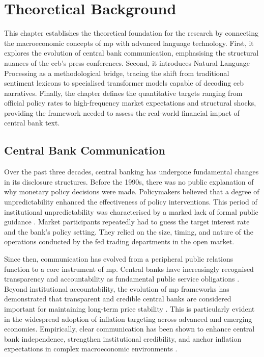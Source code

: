 \chapter{Theoretical Background}\label{ch:theory}
This chapter establishes the theoretical foundation for the research by connecting the macroeconomic concepts of \gls{mp} with advanced language technology. First, it explores the evolution of central bank communication, emphasising the structural nuances of the \gls{ecb}'s press conferences. Second, it introduces Natural Language Processing as a methodological bridge, tracing the shift from traditional sentiment lexicons to specialised transformer models capable of decoding \gls{ecb} narratives. Finally, the chapter defines the quantitative targets ranging from official policy rates to high-frequency market expectations and structural shocks, providing the framework needed to assess the real-world financial impact of central bank text.

\section{Central Bank Communication}
Over the past three decades, central banking has undergone fundamental changes in its disclosure structures. Before the 1990s, there was no public explanation of why monetary policy decisions were made. Policymakers believed that a degree of unpredictability enhanced the effectiveness of policy interventions. This period of institutional unpredictability was characterised by a marked lack of formal public guidance \cite[p. 3]{NBERw11898}. Market participants repeatedly had to guess the target interest rate and the bank's policy setting. They relied on the size, timing, and nature of the operations conducted by the \gls{fed} trading departments in the open market.

Since then, communication has evolved from a peripheral public relations function to a core instrument of \gls{mp}. Central banks have increasingly recognised transparency and accountability as fundamental public service obligations \cite[p. 15--18]{blinder2008central}. Beyond institutional accountability, the evolution of \gls{mp} frameworks has demonstrated that transparent and credible central banks are considered important for maintaining long-term price stability \cite{daly2025dynamic}. This is particularly evident in the widespread adoption of inflation targeting across advanced and emerging economies. Empirically, clear communication has been shown to enhance central bank independence, strengthen institutional credibility, and anchor inflation expectations in complex macroeconomic environments \cite[p. 7]{filardo2008transparency}.

